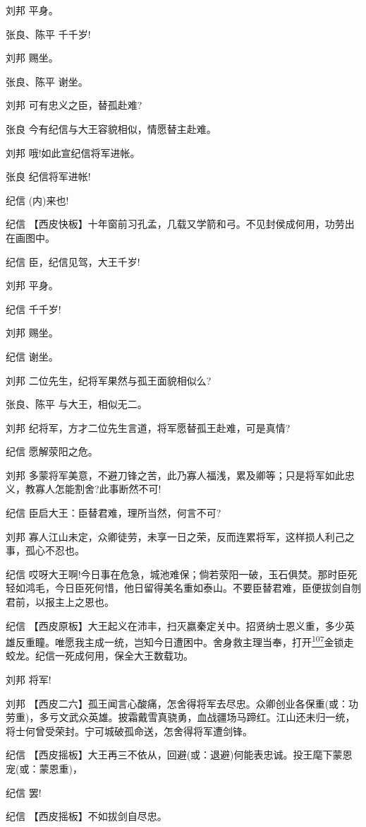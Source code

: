 刘邦 平身。

张良、陈平 千千岁!

刘邦 赐坐。

张良、陈平 谢坐。

刘邦 可有忠义之臣，替孤赴难?

张良 今有纪信与大王容貌相似，情愿替主赴难。

刘邦 哦!如此宣纪信将军进帐。

张良 纪信将军进帐!

纪信 (内)来也!

纪信
【西皮快板】十年窗前习孔孟，几载又学箭和弓。不见封侯成何用，功劳出在画图中。

纪信 臣，纪信见驾，大王千岁!

刘邦 平身。

纪信 千千岁!

刘邦 赐坐。

纪信 谢坐。

刘邦 二位先生，纪将军果然与孤王面貌相似么?

张良、陈平 与大王，相似无二。

刘邦 纪将军，方才二位先生言道，将军愿替孤王赴难，可是真情?

纪信 愿解荥阳之危。

刘邦
多蒙将军美意，不避刀锋之苦，此乃寡人福浅，累及卿等；只是将军如此忠义，教寡人怎能割舍?此事断然不可!

纪信 臣启大王：臣替君难，理所当然，何言不可?

刘邦
寡人江山未定，众卿徒劳，未享一日之荣，反而连累将军，这样损人利己之事，孤心不忍也。

纪信
哎呀大王啊!今日事在危急，城池难保；倘若荥阳一破，玉石俱焚。那时臣死轻如鸿毛，今日臣死何惜，他日留得美名重如泰山。不要臣替君难，臣便拔剑自刎君前，以报主上之恩也。

纪信
【西皮原板】大王起义在沛丰，扫灭嬴秦定关中。招贤纳士恩义重，多少英雄反重瞳。唯愿我主成一统，岂知今日遭困中。舍身救主理当奉，打开\protect\hyperlink{fn107}{\textsuperscript{107}}金锁走蛟龙。纪信一死成何用，保全大王数载功。

刘邦 将军!

刘邦
【西皮二六】孤王闻言心酸痛，怎舍得将军去尽忠。众卿创业各保重(或：功劳重)，多亏文武众英雄。披霜戴雪真骁勇，血战疆场马蹄红。江山还未归一统，将士何曾受荣封。宁可城破孤命送，怎舍得将军遭剑锋。

纪信
【西皮摇板】大王再三不依从，回避(或：退避)何能表忠诚。投王麾下蒙恩宠(或：蒙恩重)，

纪信 罢!

纪信 【西皮摇板】不如拔剑自尽忠。

